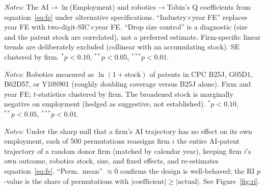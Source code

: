 \documentclass[12pt]{article}
\begin{document}
\begin{table}[htbp]\centering
\begin{threeparttable}
\caption{Alternative identification for the two headline elasticities}\label{tab:altfe}\small

\begin{tablenotes}\small\item \textit{Notes:} The AI$\to\ln$(Employment) and robotics$\to$Tobin's
Q coefficients from equation~\eqref{eq:fe} under alternative specifications. ``Industry$\times$year
FE'' replaces year FE with two-digit-SIC$\times$year FE. ``Drop size control'' is a diagnostic
(size and the patent stock are correlated), not a preferred estimate. Firm-specific linear trends
are deliberately excluded (collinear with an accumulating stock). SE clustered by firm.
$^{*}p<0.10$, $^{**}p<0.05$, $^{***}p<0.01$.
\end{tablenotes}
\end{threeparttable}
\end{table}

\begin{table}[htbp]\centering
\begin{threeparttable}
\caption{Robustness: broadened robotics (B25J + autonomous vehicles + legged robots)}\label{tab:robbroad}\small

\begin{tablenotes}\small\item \textit{Notes:} Robotics measured as $\ln(1+\text{stock})$ of
patents in CPC B25J, G05D1, B62D57, or Y10S901 (roughly doubling coverage versus B25J alone).
Firm and year FE; $t$-statistics clustered by firm. The broadened stock is marginally negative on
employment (hedged as suggestive, not established). $^{*}p<0.10$, $^{**}p<0.05$, $^{***}p<0.01$.
\end{tablenotes}
\end{threeparttable}
\end{table}

\begin{table}[htbp]\centering
\begin{threeparttable}
\caption{Randomization inference for the AI$\to$employment elasticity}\label{tab:ri}\small

\begin{tablenotes}\small\item \textit{Notes:} Under the sharp null that a firm's AI trajectory has
no effect on its own employment, each of 500 permutations reassigns firm $i$ the entire AI-patent
trajectory of a random donor firm (matched by calendar year), keeping firm $i$'s own outcome,
robotics stock, size, and fixed effects, and re-estimates equation~\eqref{eq:fe}. ``Perm.\ mean''
$\approx 0$ confirms the design is well-behaved; the RI $p$-value is the share of permutations with
$|\text{coefficient}|\geq|\text{actual}|$. See Figure~\ref{fig:ri}.
\end{tablenotes}
\end{threeparttable}
\end{table}
\end{document}
